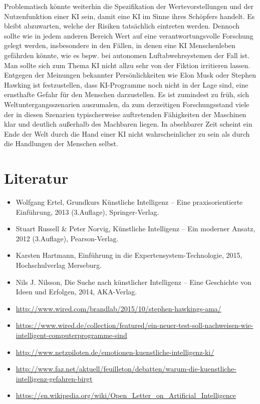 Problematisch könnte weiterhin die Spezifikation der Wertevorstellungen und der Nutzenfunktion einer KI sein, damit eine KI im Sinne ihres Schöpfers handelt.
Es bleibt abzuwarten, welche der Risiken tatsächlich eintreten werden.
Dennoch sollte wie in jedem anderen Bereich Wert auf eine verantwortungsvolle Forschung gelegt werden, insbesondere in den Fällen, in denen eine KI Menschenleben gefährden könnte, wie es bspw.
bei autonomen Luftabwehrsystemen der Fall ist.
Man sollte sich zum Thema KI nicht allzu sehr von der Fiktion irritieren lassen.
Entgegen der Meinungen bekannter Persönlichkeiten wie Elon Musk oder Stephen Hawking ist festzustellen, dass KI-Programme noch nicht in der Lage sind, eine ernsthafte Gefahr für den Menschen darzustellen.
Es ist zumindest zu früh, sich Weltuntergangsszenarien auszumalen, da zum derzeitigen Forschungsstand viele der in diesen Szenarien typischerweise auftretenden Fähigkeiten der Maschinen klar und deutlich außerhalb des Machbaren liegen.
In absehbarer Zeit scheint ein Ende der Welt durch die Hand einer KI nicht wahrscheinlicher zu sein als durch die Handlungen der Menschen selbst.

\section{Literatur}
\begin{itemize}
\item Wolfgang Ertel, Grundkurs Künstliche Intelligenz – Eine praxisorientierte Einführung, 2013 (3.Auflage), Springer-Verlag.
\item Stuart Russell \& Peter Norvig, Künstliche Intelligenz – Ein moderner Ansatz, 2012 (3.Auflage), Pearson-Verlag.
\item Karsten Hartmann, Einführung in die Expertensystem-Technologie, 2015, Hochschulverlag Merseburg.
\item Nils J.
Nilsson, Die Suche nach künstlicher Intelligenz – Eine Geschichte von Ideen und Erfolgen, 2014, AKA-Verlag.
\item \url{http://www.wired.com/brandlab/2015/10/stephen-hawkings-ama/}
\item \url{https://www.wired.de/collection/featured/ein-neuer-test-soll-nachweisen-wie-intelligent-computerprogramme-sind}
\item \url{http://www.netzpiloten.de/emotionen-kuenstliche-intelligenz-ki/}
\item \url{http://www.faz.net/aktuell/feuilleton/debatten/warum-die-kuenstliche-intelligenz-gefahren-birgt}
\item \url{https://en.wikipedia.org/wiki/Open_Letter_on_Artificial_Intelligence}
\end{itemize}
